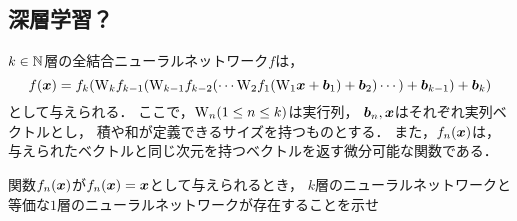 \subsection{深層学習？}
    $k \in \mathbb{N}$層の全結合ニューラルネットワーク$f$は，
    \begin{equation}
    f(\boldsymbol{x}) =
      f_k(\mathrm{W}_k
        f_{k-1}(\mathrm{W}_{k-1}
          f_{k-2}(\cdots \mathrm{W}_2
            f_1(\mathrm{W}_1
              \boldsymbol{x} + \boldsymbol{b}_1)
            + \boldsymbol{b}_2) \cdots)
          + \boldsymbol{b}_{k-1})
        + \boldsymbol{b}_k)
    \end{equation}
    として与えられる．
    ここで，$\mathrm{W}_n (1 \le n \le k)$は実行列，
    $\boldsymbol{b}_n, \boldsymbol{x}$はそれぞれ実列ベクトルとし，
    積や和が定義できるサイズを持つものとする．
    また，$f_n(\boldsymbol{x})$は，
    与えられたベクトルと同じ次元を持つベクトルを返す微分可能な関数である．

    関数$f_n(\boldsymbol{x})$が$f_n(\boldsymbol{x}) = \boldsymbol{x}$として与えられるとき，
    $k$層のニューラルネットワークと等価な$1$層のニューラルネットワークが存在することを示せ


